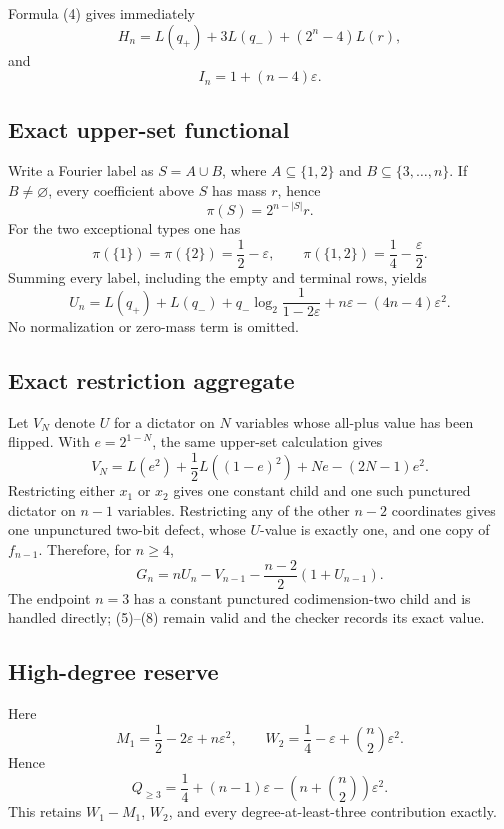 Formula (4) gives immediately
\[
 \boxed{H_n=L(q_+)+3L(q_-)+(2^n-4)L(r)},                 \tag{5}
\]
and
\[
 \boxed{I_n=1+(n-4)\varepsilon}.                        \tag{6}
\]

\subsection*{Exact upper-set functional}

Write a Fourier label as \(S=A\cup B\), where
\(A\subseteq\{1,2\}\) and
\(B\subseteq\{3,\ldots,n\}\).  If \(B\ne\varnothing\), every
coefficient above \(S\) has mass \(r\), hence
\[
 \pi(S)=2^{n-|S|}r.
\]
For the two exceptional types one has
\[
 \pi(\{1\})=\pi(\{2\})=\frac12-\varepsilon,
 \qquad
 \pi(\{1,2\})=\frac14-\frac\varepsilon2.
\]
Summing every label, including the empty and terminal rows, yields
\[
 \boxed{
 U_n=L(q_+)+L(q_-)
      +q_-\log_2\frac1{1-2\varepsilon}
      +n\varepsilon-(4n-4)\varepsilon^2.}               \tag{7}
\]
No normalization or zero-mass term is omitted.

\subsection*{Exact restriction aggregate}

Let \(V_N\) denote \(U\) for a dictator on \(N\) variables whose
all-plus value has been flipped.  With \(e=2^{1-N}\), the same upper-set
calculation gives
\[
 V_N=L(e^2)+\frac12L((1-e)^2)+Ne-(2N-1)e^2.              \tag{8}
\]
Restricting either \(x_1\) or \(x_2\) gives one constant child and one
such punctured dictator on \(n-1\) variables.  Restricting any of the
other \(n-2\) coordinates gives one unpunctured two-bit defect, whose
\(U\)-value is exactly one, and one copy of \(f_{n-1}\).  Therefore, for
\(n\ge4\),
\[
 \boxed{
 G_n=nU_n-V_{n-1}-\frac{n-2}{2}(1+U_{n-1}).}             \tag{9}
\]
The endpoint \(n=3\) has a constant punctured codimension-two child and is
handled directly; (5)--(8) remain valid and the checker records its exact
value.

\subsection*{High-degree reserve}

Here
\[
 M_1=\frac12-2\varepsilon+n\varepsilon^2,
 \qquad
 W_2=\frac14-\varepsilon+\binom n2\varepsilon^2.
\]
Hence
\[
 \boxed{
 Q_{\ge3}=\frac14+(n-1)\varepsilon
       -\left(n+\binom n2\right)\varepsilon^2.}          \tag{10}
\]
This retains \(W_1-M_1\), \(W_2\), and every degree-at-least-three
contribution exactly.

